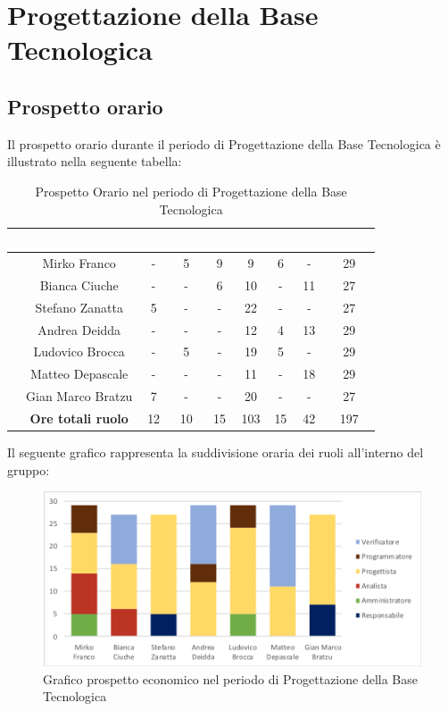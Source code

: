 \newpage
\section{Progettazione della Base Tecnologica}
\subsection{Prospetto orario}
Il prospetto orario durante il periodo di Progettazione della Base Tecnologica è illustrato nella seguente tabella:

\begin{table}[ht]
	\begin{center}
		\begin{tabular}{ccccccccc}
			\rowcolor{coolblack}
			\hline
			& \textcolor{white}{Nome} & \textcolor{white}{Re} & \textcolor{white}{Am} & \textcolor{white}{An} & \textcolor{white}{Pt} &\textcolor{white}{Pr} & \textcolor{white}{Ve} & \textcolor{white}{Totale} \\
			\hline
			&Mirko Franco & - & 5 & 9 & 9 & 6 & - & 29  \\
			&Bianca Ciuche & -& - & 6 & 10 & - & 11 & 27 \\
			&Stefano Zanatta & 5 & - & - & 22 & - & - & 27 \\
			&Andrea Deidda &  -& - & - & 12 & 4 & 13 & 29 \\
			&Ludovico Brocca & -& 5 & - & 19 & 5 & - & 29 \\
			&Matteo Depascale & -& - & - & 11 & - & 18 & 29 \\
			&Gian Marco Bratzu & 7& - & - & 20 & - & - & 27 \\
			\hline
			&\textbf{Ore totali ruolo} & 12 & 10 & 15 & 103 & 15 & 42 & 197 \\
		\end{tabular}
		\caption{Prospetto Orario nel periodo di Progettazione della Base Tecnologica}
	\end{center}
\end{table}

Il seguente grafico rappresenta la suddivisione oraria dei ruoli all'interno del gruppo:
\begin{figure}[!ht]
	\begin{center}
		\includegraphics[scale=0.80]{images/grafoProgettazioneTecnologica.png}
		\caption{Grafico prospetto economico nel periodo di Progettazione della Base Tecnologica}
	\end{center}
\end{figure}
\newpage
